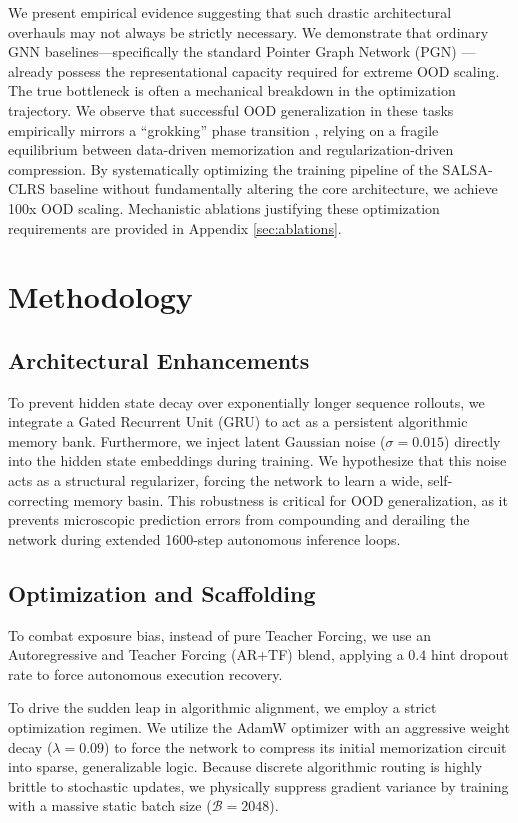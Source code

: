 \documentclass{article}
\begin{document}
We present empirical evidence suggesting that such drastic architectural overhauls may not always be strictly necessary. We demonstrate that ordinary GNN baselines---specifically the standard Pointer Graph Network (PGN) \cite{velickovic2020pointer}---already possess the representational capacity required for extreme OOD scaling. The true bottleneck is often a mechanical breakdown in the optimization trajectory. We observe that successful OOD generalization in these tasks empirically mirrors a ``grokking'' phase transition \cite{power2022grokking}, relying on a fragile equilibrium between data-driven memorization and regularization-driven compression. By systematically optimizing the training pipeline of the SALSA-CLRS baseline without fundamentally altering the core architecture, we achieve 100x OOD scaling. Mechanistic ablations justifying these optimization requirements are provided in Appendix \ref{sec:ablations}.

\section{Methodology}

\subsection{Architectural Enhancements}
To prevent hidden state decay over exponentially longer sequence rollouts, we integrate a Gated Recurrent Unit (GRU) to act as a persistent algorithmic memory bank. Furthermore, we inject latent Gaussian noise ($\sigma = 0.015$) directly into the hidden state embeddings during training. We hypothesize that this noise acts as a structural regularizer, forcing the network to learn a wide, self-correcting memory basin. This robustness is critical for OOD generalization, as it prevents microscopic prediction errors from compounding and derailing the network during extended 1600-step autonomous inference loops.

\subsection{Optimization and Scaffolding}
To combat exposure bias, instead of pure Teacher Forcing, we use an Autoregressive and Teacher Forcing (AR+TF) blend, applying a $0.4$ hint dropout rate to force autonomous execution recovery. 

To drive the sudden leap in algorithmic alignment, we employ a strict optimization regimen. We utilize the AdamW optimizer with an aggressive weight decay ($\lambda=0.09$) to force the network to compress its initial memorization circuit into sparse, generalizable logic. Because discrete algorithmic routing is highly brittle to stochastic updates, we physically suppress gradient variance by training with a massive static batch size ($\mathcal{B}=2048$).
\end{document}
